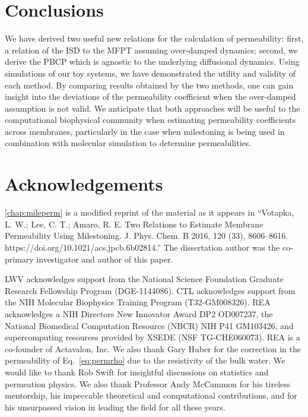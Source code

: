 \section{Conclusions}
    \par We have derived two useful new relations for the calculation of permeability: first, a relation of the ISD to the MFPT assuming over-damped dynamics; second, we derive the PBCP which is agnostic to the underlying diffusional dynamics. Using simulations of our toy systems, we have demonstrated the utility and validity of each method. By comparing results obtained by the two methods, one can gain insight into the deviations of the permeability coefficient when the over-damped assumption is not valid. We anticipate that both approaches will be useful to the computational biophysical community when estimating permeability coefficients across membranes, particularly in the case when milestoning is being used in combination with molecular simulation to determine permeabilities.

    \section{Acknowledgements}
        \par \cref{chap:mileperm} is a modified reprint of the material as it appears in ``Votapka, L. W.; Lee, C. T.; Amaro, R. E. Two Relations to Estimate Membrane Permeability Using Milestoning. J. Phys. Chem. B 2016, 120 (33), 8606–8616. https://doi.org/10.1021/acs.jpcb.6b02814.''
        The dissertation author was the co-primary investigator and author of this paper.

        \par LWV acknowledges support from the National Science Foundation Graduate Research Fellowship Program (DGE-1144086). CTL acknowledges support from the NIH Molecular Biophysics Training Program (T32-GM008326). REA acknowledges a NIH Directors New Innovator Award DP2 OD007237, the National Biomedical Computation Resource (NBCR) NIH P41 GM103426, and supercomputing resources provided by XSEDE (NSF TG-CHE060073). REA is a co-founder of Actavalon, Inc. We also thank Gary Huber for the correction in the permeability of Eq.~\ref{eq:permrho} due to the resistivity of the bulk water. We would like to thank Rob Swift for insightful discussions on statistics and permeation physics. We also thank Professor Andy McCammon for his tireless mentorship, his impeccable theoretical and computational contributions, and for his unsurpassed vision in leading the field for all these years.
